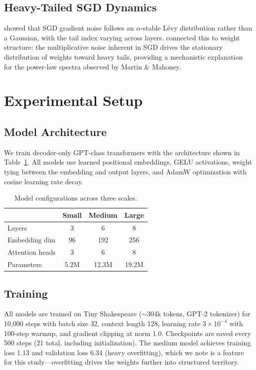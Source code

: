 \documentclass[11pt,a4paper]{article}
\begin{document}
\subsection{Heavy-Tailed SGD Dynamics}

\citet{simsekli2019tail} showed that SGD gradient noise follows an $\alpha$-stable L\'{e}vy distribution rather than a Gaussian, with the tail index varying across layers. \citet{hodgkinson2021multiplicative} connected this to weight structure: the multiplicative noise inherent in SGD drives the stationary distribution of weights toward heavy tails, providing a mechanistic explanation for the power-law spectra observed by Martin \& Mahoney.

\section{Experimental Setup}

\subsection{Model Architecture}

We train decoder-only GPT-class transformers with the architecture shown in Table~\ref{tab:models}. All models use learned positional embeddings, GELU activations, weight tying between the embedding and output layers, and AdamW optimization with cosine learning rate decay.

\begin{table}[h]
\centering
\caption{Model configurations across three scales.}
\label{tab:models}
\begin{tabular}{lccc}
\toprule
& \textbf{Small} & \textbf{Medium} & \textbf{Large} \\
\midrule
Layers & 3 & 6 & 8 \\
Embedding dim & 96 & 192 & 256 \\
Attention heads & 3 & 6 & 8 \\
Parameters & 5.2M & 12.3M & 19.2M \\
\bottomrule
\end{tabular}
\end{table}

\subsection{Training}

All models are trained on Tiny Shakespeare ($\sim$304k tokens, GPT-2 tokenizer) for 10,000 steps with batch size 32, context length 128, learning rate $3 \times 10^{-4}$ with 100-step warmup, and gradient clipping at norm 1.0. Checkpoints are saved every 500 steps (21 total, including initialization). The medium model achieves training loss 1.13 and validation loss 6.34 (heavy overfitting), which we note is a feature for this study---overfitting drives the weights further into structured territory.
\end{document}
